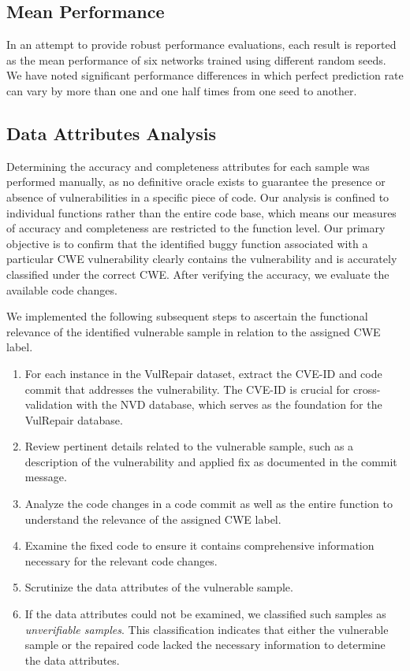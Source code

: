 \subsection{Mean Performance}

In an attempt to provide robust performance evaluations, each result is reported as the mean performance of six networks trained using different random seeds.
We have noted significant performance differences in which perfect prediction rate can vary by more than one and one half times from one seed to another.


\subsection{Data Attributes Analysis}\label{Data-Attributes-Analysis}
Determining the accuracy and completeness attributes for each sample was performed manually, as no definitive oracle exists to guarantee the presence or absence of vulnerabilities in a specific piece of code.
Our analysis is confined to individual functions rather than the entire code base, which means our measures of accuracy and completeness are restricted to the function level.
Our primary objective is to confirm that the identified buggy function associated with a particular CWE vulnerability clearly contains the vulnerability and is accurately classified under the correct CWE.
After verifying the accuracy, we evaluate the available code changes. 


 We implemented the following subsequent steps to ascertain the functional relevance of the identified vulnerable sample in relation to the assigned CWE label.
 \begin{enumerate}
\item For each instance in the VulRepair dataset, extract the CVE-ID and code commit that addresses the vulnerability.
The CVE-ID is crucial for cross-validation with the NVD database, which serves as the foundation for the VulRepair database.
\item Review pertinent details related to the vulnerable sample, such as a description of the vulnerability and applied fix as documented in the commit message.
\item Analyze the code changes in a code commit as well as the entire function to understand the relevance of the assigned CWE label.
\item Examine the fixed code to ensure it contains comprehensive information necessary for the relevant code changes.
\item Scrutinize the data attributes of the vulnerable sample.
\item If the data attributes could not be examined, we classified such samples as \textit{unverifiable samples}. This classification indicates that either the vulnerable sample or the repaired code lacked the necessary information to determine the data attributes.
 \end{enumerate}




